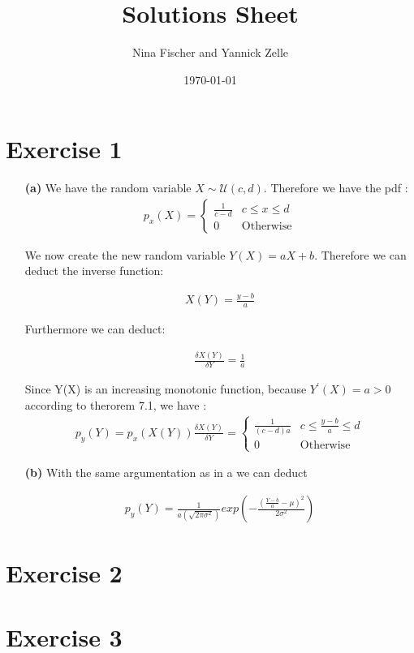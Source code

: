 \documentclass{article}
\title{Solutions Sheet}
\author{Nina Fischer and Yannick Zelle}
\date\today
\begin{document}
\maketitle %




\section*{Exercise 1}
\begin{itemize}
    \item [\textbf{(a)}] We have the random variable $X \sim \mathcal{U}(c,d)$. Therefore we have the pdf :
 \begin{align*}
 p_x(X) =   \begin{cases}
    \frac{1}{c-d} &c \leq x \leq d \\
    0 &\text{Otherwise}
    \end{cases}
\end{align*}

We now create the new random variable $Y(X)=aX+b$. Therefore we can deduct the inverse function:

\begin{align*}
    X(Y) = \frac{y-b}{a}
\end{align*}

Furthermore we can deduct:

\begin{align*}
    \frac{\delta X(Y)}{\delta Y} = \frac{1}{a}
\end{align*}

Since Y(X) is an increasing monotonic function, because $Y^{\prime}(X)=a>0$ according to therorem 7.1, we have :
\begin{align*}
p_y(Y) = p_x(X(Y)) \frac{\delta X(Y)}{\delta Y} = \begin{cases}
    \frac{1}{(c-d)a} &c \leq \frac{y-b}{a} \leq d \\
    0 &\text{Otherwise}
    \end{cases}
\end{align*}

\item[\textbf{(b)}] With the same argumentation as in a we can deduct

\begin{align*}
    p_y(Y)= \frac{1}{a(\sqrt{2\pi \sigma^2})}exp(-\frac{(\frac{Y-b}{a}- \mu)^2}{2 \sigma^2})
\end{align*}  
\end{itemize}

\section*{Exercise 2}

\section*{Exercise 3}
\end{document}
